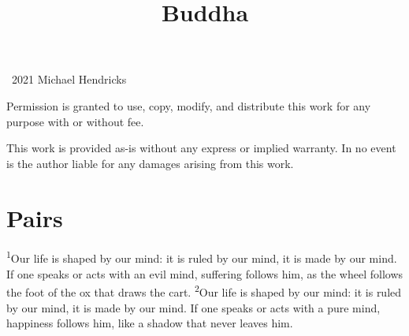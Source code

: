 \documentclass[openany,12pt,english]{book}
\title{Buddha}
\author{}
\date{}
\newenvironment{para}{\par\pretolerance=100\tolerance=200\setlength{\emergencystretch}{0.6em}\relax}{\par}
\begin{document}
\maketitle

{
\thispagestyle{empty}
\vspace*{\fill}
\begin{changemargin}{.8in}{.8in}
\begin{center}
\textcopyright{}~2021 Michael Hendricks

\vspace{0.5\baselineskip}

Permission is granted to use, copy, modify, and distribute
this work for any purpose with or without fee.

\vspace{0.5\baselineskip}

This work is provided as-is without any express or implied
warranty. In no event is the author liable for any damages
arising from this work.
\end{center}
\end{changemargin}
}
\clearpage{}

\tableofcontents
\clearpage{}

\markboth{}{}


\section*{Pairs}
\begin{para}
    \textsuperscript{1}\thinspace{}Our life is shaped by our mind: it is ruled by our mind, it is made by our mind. If one speaks or acts with an evil mind, suf\-fer\-ing follows him, as the wheel follows the foot of the ox that draws the cart.
    \textsuperscript{2}\thinspace{}Our life is shaped by our mind: it is ruled by our mind, it is made by our mind. If one speaks or acts with a pure mind, hap\-pi\-ness follows him, like a shad\-ow that nev\-er leaves him.
\end{para}
\end{document}

